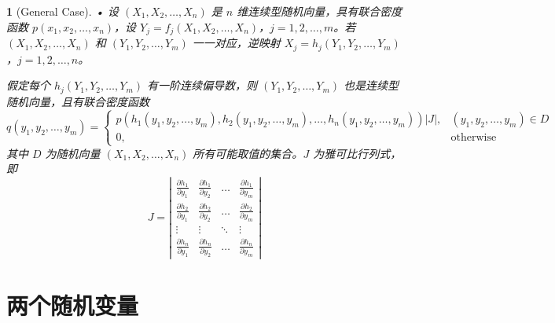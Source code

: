 \documentclass[UTF8]{report}
\theoremstyle{MyLineTheoremStyle} %
\theoremstyle{MyBlockTheoremStyle} %
\theoremstyle{MySubsubsectionStyle} %
\newtheorem{definition}{}
\begin{document}
\begin{definition}[General Case]
    • 设 $(X_1, X_2, \ldots, X_n)$ 是 $n$ 维连续型随机向量，具有联合密度函数 $p(x_1, x_2, \ldots, x_n)$，设 $Y_j = f_j(X_1, X_2, \ldots, X_n)$，$j=1,2,\ldots,m$。若 $(X_1, X_2, \ldots, X_n)$ 和 $(Y_1, Y_2, \ldots, Y_m)$ 一一对应，逆映射 $X_j = h_j(Y_1, Y_2, \ldots, Y_m)$，$j=1,2,\ldots,n$。\par
    假定每个 $h_j(Y_1, Y_2, \ldots, Y_m)$ 有一阶连续偏导数，则 $(Y_1, Y_2, \ldots, Y_m)$ 也是连续型随机向量，且有联合密度函数
    \[
    q(y_1, y_2, \ldots, y_m) =
    \begin{cases}
         p(h_1(y_1, y_2, \ldots, y_m), h_2(y_1, y_2, \ldots, y_m), \ldots, h_n(y_1, y_2, \ldots, y_m)) \left| J \right|, & (y_1, y_2, \ldots, y_m) \in D \\
         0, & \text{otherwise}
    \end{cases}
    \]
    其中 $D$ 为随机向量 $(X_1, X_2, \ldots, X_n)$ 所有可能取值的集合。$J$ 为雅可比行列式，即
    \[
    J = \left|
    \begin{array}{cccc}
        \frac{\partial h_1}{\partial y_1} & \frac{\partial h_1}{\partial y_2} & \ldots & \frac{\partial h_1}{\partial y_m} \\
        \frac{\partial h_2}{\partial y_1} & \frac{\partial h_2}{\partial y_2} & \ldots & \frac{\partial h_2}{\partial y_m} \\
        \vdots & \vdots & \ddots & \vdots \\
        \frac{\partial h_n}{\partial y_1} & \frac{\partial h_n}{\partial y_2} & \ldots & \frac{\partial h_n}{\partial y_m}
    \end{array}
    \right|
    \]
\end{definition}

\section{两个随机变量}
\end{document}
